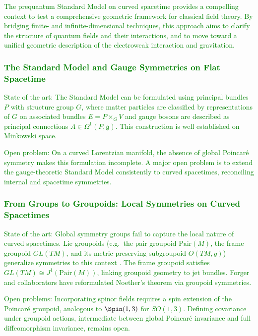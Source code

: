 \documentclass[11pt,draftproposal]{msca-pf}
\begin{document}
\textcolor{green}{The prequantum Standard Model on curved spacetime provides a compelling context to test a comprehensive geometric framework for classical field theory. By bridging finite- and infinite-dimensional techniques, this approach aims to clarify the structure of quantum fields and their interactions, and to move toward a unified geometric description of the electroweak interaction and gravitation.}

\subsubsection*{\textcolor{green}{The Standard Model and Gauge Symmetries on Flat Spacetime}}
\textcolor{green}{State of the art: The Standard Model can be formulated using principal bundles $P$ with structure group $G$, where matter particles are classified by representations of $G$ on associated bundles $E = P \times_G V$ and gauge bosons are described as principal connections $A \in \Omega^1(P, \mathfrak g)$. This construction is well established on Minkowski space.}

\textcolor{green}{Open problem: On a curved Lorentzian manifold, the absence of global Poincaré symmetry makes this formulation incomplete. A major open problem is to extend the gauge-theoretic Standard Model consistently to curved spacetimes, reconciling internal and spacetime symmetries.}

\subsubsection*{\textcolor{green}{From Groups to Groupoids: Local Symmetries on Curved Spacetimes}}
\textcolor{green}{State of the art: Global symmetry groups fail to capture the local nature of curved spacetimes. Lie groupoids (e.g.\ the pair groupoid $\mathrm{Pair}(M)$, the frame groupoid $GL(TM)$, and its metric-preserving subgroupoid $O(TM,g)$) generalize symmetries to this context \cite{Forger2005, CostaPegas2021}. The frame groupoid satisfies $GL(TM) \cong J^1(\mathrm{Pair}(M))$, linking groupoid geometry to jet bundles. Forger and collaborators have reformulated Noether’s theorem via groupoid symmetries.}

\textcolor{green}{Open problems: Incorporating spinor fields requires a spin extension of the Poincaré groupoid, analogous to $\Spin(1,3)$ for $SO(1,3)$. Defining covariance under groupoid actions, intermediate between global Poincaré invariance and full diffeomorphism invariance, remains open.}
\end{document}
